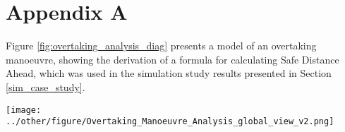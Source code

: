 \newpage
\begingroup
\let\clearpage\relax 
\onecolumn 
\section*{Appendix A}\label{appendix_a}
Figure \ref{fig:overtaking_analysis_diag} presents a model of an overtaking manoeuvre, showing the derivation of a formula for calculating Safe Distance Ahead, which was used in the simulation study results presented in Section \ref{sim_case_study}.
\begin{figure*}[h]
    \texttt{[image: ../other/figure/Overtaking\_Manoeuvre\_Analysis\_global\_view\_v2.png]}
    \caption{Schematic of Model-based Analysis of Overtaking Manoeuvre.}
    \label{fig:overtaking_analysis_diag}
\end{figure*}
\endgroup